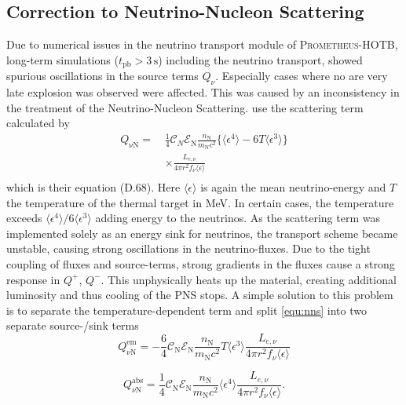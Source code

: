 \documentclass[fleqn,usenatbib]{mnras}
\newcommand{\tpb}{\ensuremath{t_{\text{pb}}}}
\newcommand{\s}{\ensuremath{\text{s}}}
\newcommand{\prom}{\textsc{Prometheus-HOTB}\xspace}
\begin{document}
\subsection{Correction to Neutrino-Nucleon Scattering}
Due to numerical issues in the neutrino transport module of \prom, long-term simulations ($\tpb\mathord{>3\,\s}$) including the neutrino transport, showed spurious oscillations in the source terms $Q_{\nu}$. Especially cases where no are very late explosion was observed were affected. 
This was caused by an inconsistency  in the treatment of the Neutrino-Nucleon Scattering.
\cite{Scheck2006} use the scattering term calculated by \cite{Tubbs1979}
\begin{equation}\label{equ:nns}
\begin{aligned}
Q_{\mathrm{\nu N}} = \, & \frac{1}{4} \mathcal{C}_N \mathcal{E}_{\mathrm{N}} \frac{n_{\mathrm{N}}}{m_{\mathrm{N}}c^2}
\{\langle \epsilon^4 \rangle - 6 T\langle \epsilon^3 \rangle  \} \\
& \times  \frac{L_{e,\nu}}{4\pi r^2 f_{\nu}\langle \epsilon \rangle}\\
\end{aligned}
\end{equation}
which is their equation (D.68). Here $\langle \epsilon \rangle$ is again the mean neutrino-energy and $T$ the temperature of the thermal target in MeV.
In certain cases, the temperature exceeds $\langle \epsilon^4 \rangle / 6 \langle \epsilon^3 \rangle $ adding energy to the neutrinos. As the scattering term was implemented solely as an energy sink for neutrinos, the transport scheme became unstable, causing strong oscillations in the neutrino-fluxes. Due to the tight coupling of fluxes and source-terms, strong gradients in the fluxes cause a strong response in $Q^+$, $Q^-$. This unphysically heats up the material, creating additional luminosity and thus cooling of the PNS stops.
A simple solution to this problem is to separate the temperature-dependent term and split \ref{equ:nns} into two separate source-/sink terms
\begin{equation}\label{equ:nns1}
Q^{\mathrm{em}}_{\nu \mathrm{N}} = - \frac{6}{4} \mathcal{C}_{\mathrm{N}} \mathcal{E}_{\mathrm{N}} \frac{n_{\mathrm{N}}}{m_{\mathrm{N}}c^2}
T \langle \epsilon^3 \rangle \frac{L_{e,\nu}}{4\pi r^2 f_{\nu}\langle \epsilon \rangle}
\end{equation}

\begin{equation}\label{equ:nns2}
Q^{\mathrm{abs}}_{\nu \mathrm{N}} = \frac{1}{4} \mathcal{C}_{\mathrm{N}} \mathcal{E}_{\mathrm{N}} \frac{n_{\mathrm{N}}}{m_{\mathrm{N}}c^2}
\langle \epsilon^4 \rangle \frac{L_{e,\nu}}{4\pi r^2 f_{\nu}\langle \epsilon \rangle}.
\end{equation}
\end{document}
